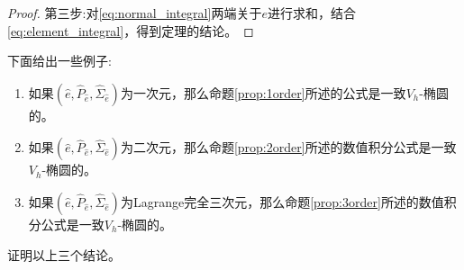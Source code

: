 \begin{proof}
    第三步:对\eqref{eq:normal_integral}两端关于$e$进行求和，结合\eqref{eq:element_integral}，得到定理的结论。
\end{proof}
下面给出一些例子:
\begin{enumerate}
    \item 如果$(\hat{e},\hat{P}_{\hat{e}},\hat{\Sigma}_{\hat{e}})$为一次元，那么命题\ref{prop:1order}所述的公式是一致$V_{h}$-椭圆的。
    \item 如果$(\hat{e},\hat{P}_{\hat{e}},\hat{\Sigma}_{\hat{e}})$为二次元，那么命题\ref{prop:2order}所述的数值积分公式是一致$V_{h}$-椭圆的。
   \item 如果$(\hat{e},\hat{P}_{\hat{e}},\hat{\Sigma}_{\hat{e}})$为Lagrange完全三次元，那么命题\ref{prop:3order}所述的数值积分公式是一致$V_{h}$-椭圆的。
\end{enumerate}
\begin{exercise}
    证明以上三个结论。
\end{exercise}
